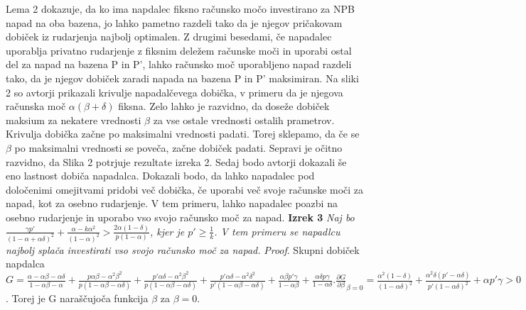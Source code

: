 \documentclass{acm_proc_article-sp}
\begin{document}
Lema 2 dokazuje, da ko ima napdalec fiksno računsko močo investirano za NPB napad na oba bazena, jo lahko pametno razdeli tako da je njegov pričakovam dobiček iz rudarjenja najbolj optimalen. Z drugimi besedami, če napadalec uporablja privatno rudarjenje z fiksnim deležem računske moči in uporabi ostal del za napad na bazena P in P', lahko računsko moč uporabljeno napad razdeli tako, da je njegov dobiček zaradi napada na bazena P in P' maksimiran. Na sliki 2 so avtorji prikazali krivulje napadalčevega dobička, v primeru da je njegova računska moč $\alpha(\beta + \delta)$ fiksna. Zelo lahko je razvidno, da doseže dobiček maksium za nekatere vrednosti $\beta$ za vse ostale vrednosti ostalih prametrov. Krivulja dobička začne po maksimalni vrednosti padati. Torej sklepamo, da če se $\beta$ po maksimalni vrednosti se poveča, začne dobiček padati. Sepravi je očitno razvidno, da Slika 2 
potrjuje rezultate izreka 2. Sedaj bodo avtorji dokazali še eno lastnost dobiča napadalca. Dokazali bodo, da lahko napadalec pod določenimi omejitvami pridobi več dobička, če uporabi  več svoje računske moči za napad, kot za osebno rudarjenje. V tem primeru, lahko napadalec poazbi na osebno rudarjenje in uporabo vso svojo računsko moč za napad.
\newline
\newline
\textbf{Izrek 3} \textit{Naj bo $\frac{\gamma p'}{(1 - \alpha + \alpha\delta)^2} + \frac{\alpha - k \alpha^2}{(1 - \alpha)^2} > \frac{2\alpha(1 - \delta)}{p(1 - \alpha)}$, kjer je $p' \geq \frac{1}{k}$. V tem primeru se napadlcu najbolj splača investirati vso svojo računsko moč za napad.}
\newline
\newline
\textit{Proof}. Skupni dobiček napdalca $G = \frac{\alpha - \alpha\beta - \alpha\delta}{1 - \alpha\beta - \alpha} + \frac{p\alpha\beta - \alpha^2\beta^2}{p(1 - \alpha\beta - \alpha\delta)} + \frac{p'\alpha\delta - \alpha^2\beta^2}{p(1 - \alpha\beta - \alpha\delta)} + \frac{p'\alpha\delta - \alpha^2\delta^2}{p'(1- \alpha\beta - \alpha\delta)} + \frac{\alpha\beta p' \gamma}{1 - \alpha\beta} + \frac{\alpha\delta p \gamma}{1 - \alpha\delta}. \frac{\partial G}{\partial \beta}_{\beta=0} = \frac{\alpha^2(1 - \delta)}{(1 - \alpha\delta)^2} + \frac{\alpha^2\delta(p' - \alpha\delta)}{p'(1- \alpha\delta)^2} + \alpha p' \gamma > 0$. Torej je G naraščujoča funkcija $\beta$ za $\beta = 0.$
\end{document}
